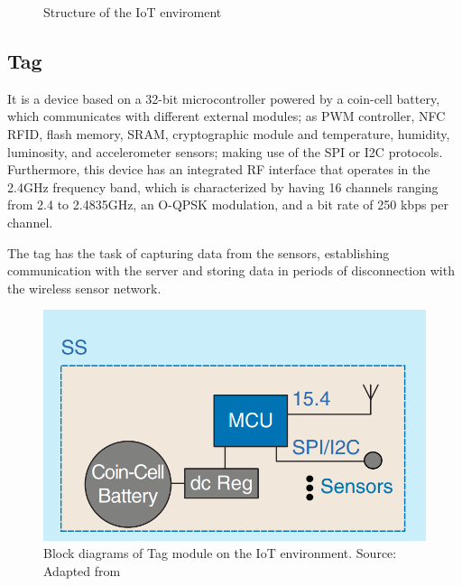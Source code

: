 \documentclass[journal]{IEEEtran}	%
\begin{document}
\begin{figure}[t]
    \centering
    \caption{Structure of the IoT enviroment}
    \label{fig:topology}
\end{figure}

\subsection{Tag}

It is a device based on a 32-bit microcontroller powered by a coin-cell battery, which communicates with different external modules; as PWM controller, NFC RFID, flash memory, SRAM, cryptographic module and temperature, humidity, luminosity, and accelerometer sensors; making use of the SPI or I2C protocols. Furthermore, this device has an integrated RF interface that operates in the 2.4GHz frequency band, which is characterized by having 16 channels ranging from 2.4 to 2.4835GHz, an O-QPSK modulation, and a bit rate of 250 kbps per channel.

The tag has the task of capturing data from the sensors, establishing communication with the server and storing data in periods of disconnection with the wireless sensor network.

\begin{figure}[H]
\centering
\includegraphics[width=0.9\columnwidth]{fig3.png}
\caption{Block diagrams of Tag module on the IoT environment. Source: Adapted from \cite{williams2017weaving}}
\label{fig:tag}
\end{figure}
\end{document}
